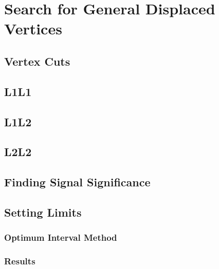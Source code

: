\chapter{Search for General Displaced Vertices}\label{chap:simps}

\section{Vertex Cuts}\label{sec:simpsvertexcuts}

\section{L1L1}\label{sec:simpsL1L1}

\section{L1L2}\label{sec:simpsL1L2}

\section{L2L2}\label{sec:simpsL2L2}

\section{Finding Signal Significance}\label{sec:simpssig}

\section{Setting Limits}\label{sec:simpslimits}

\subsection{Optimum Interval Method}\label{sec:oim}

\subsection{Results}\label{sec:simpsresults}